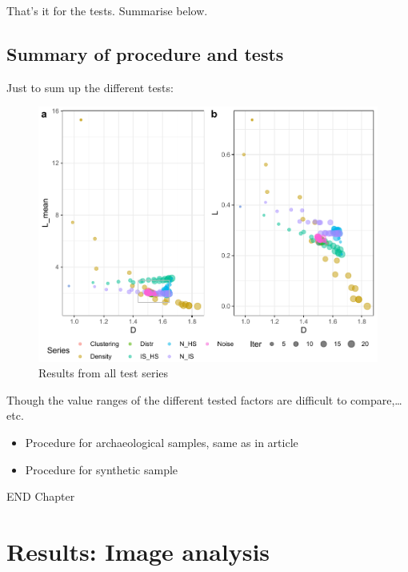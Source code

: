 \documentclass[
  12pt,
]{book}
\begin{document}
That's it for the tests. Summarise below.

\hypertarget{summary-of-procedure-and-tests}{%
\section{Summary of procedure and tests}\label{summary-of-procedure-and-tests}}

Just to sum up the different tests:



\begin{figure}

{\centering \includegraphics[width=0.9\linewidth]{bookdown-demo_files/figure-latex/08-all-1} 

}

\caption{Results from all test series}\label{fig:08-all}
\end{figure}

Though the value ranges of the different tested factors are difficult to compare,\ldots{} etc.

\begin{itemize}
\item
  Procedure for archaeological samples, same as in article
\item
  Procedure for synthetic sample
\end{itemize}

END Chapter

\hypertarget{images-results}{%
\chapter{Results: Image analysis}\label{images-results}}
\end{document}
